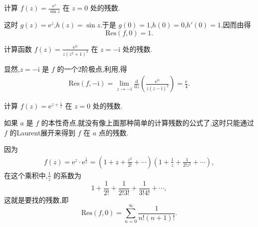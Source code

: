 \documentclass[../../main.tex]{subfiles}
\begin{document}
\begin{example}
计算 \( f(z) = \frac{\mathrm{e}^z}{\sin z} \) 在 \( z = 0 \) 处的残数.
\end{example}
\begin{solution}
这时 \( g(z) = \mathrm{e}^z \),\( h(z) = \sin z \).于是 \( g(0) = 1 \),\( h(0) = 0 \),\( h'(0) = 1 \),因而由得
\[
\mathrm{Res}(f,0) = 1.
\]
\end{solution}

\begin{example}
计算函数 \( f(z) = \frac{\mathrm{e}^{\mathrm{i}z}}{z(z^2 + 1)^2} \) 在 \( z = -\mathrm{i} \) 处的残数.
\end{example}
\begin{solution}
显然,\( z = -\mathrm{i} \) 是 \( f \) 的一个2阶极点,利用,得
\begin{align*}
\mathrm{Res}(f, -\mathrm{i}) = \lim_{z \to -\mathrm{i}} \frac{\mathrm{d}}{\mathrm{d}z} \left( \frac{\mathrm{e}^{\mathrm{i}z}}{z(z - \mathrm{i})^2} \right) = \frac{\mathrm{e}}{4}.
\end{align*}
\end{solution}

\begin{example}
计算 \( f(z) = \mathrm{e}^{z + \frac{1}{z}} \) 在 \( z = 0 \) 处的残数.
\end{example}
\begin{remark}
如果 \( a \) 是 \( f \) 的本性奇点,就没有像上面那种简单的计算残数的公式了,这时只能通过 \( f \) 的Laurent展开来得到 \( f \) 在 \( a \) 点的残数.
\end{remark}
\begin{solution}
因为
\begin{align*}
f(z) = \mathrm{e}^z \cdot \mathrm{e}^{\frac{1}{z}} = \left( 1 + z + \frac{z^2}{2!} + \cdots \right) \left( 1 + \frac{1}{z} + \frac{1}{2! z^2} + \cdots \right),
\end{align*}
在这个乘积中,\( \frac{1}{z} \) 的系数为
\[
1 + \frac{1}{2!} + \frac{1}{2! 3!} + \frac{1}{3! 4!} + \cdots,
\]
这就是要找的残数,即
\[
\mathrm{Res}(f,0) = \sum_{n = 0}^{\infty} \frac{1}{n! (n + 1)!}.
\]
\end{solution}
\end{document}

